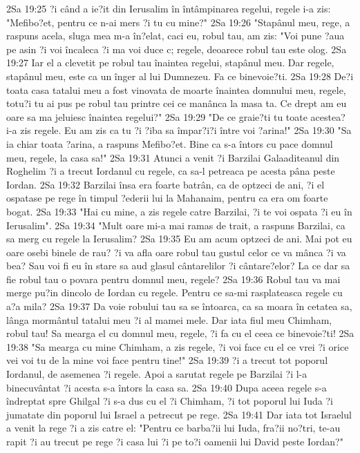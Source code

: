 2Sa 19:25  ?i când a ie?it din Ierusalim în întâmpinarea regelui, regele i-a zis: "Mefibo?et, pentru ce n-ai mers ?i tu cu mine?"
2Sa 19:26  "Stapânul meu, rege, a raspuns acela, sluga mea m-a în?elat, caci eu, robul tau, am zis: "Voi pune ?aua pe asin ?i voi încaleca ?i ma voi duce c; regele, deoarece robul tau este olog.
2Sa 19:27  Iar el a clevetit pe robul tau înaintea regelui, stapânul meu. Dar regele, stapânul meu, este ca un înger al lui Dumnezeu. Fa ce binevoie?ti.
2Sa 19:28  De?i toata casa tatalui meu a fost vinovata de moarte înaintea domnului meu, regele, totu?i tu ai pus pe robul tau printre cei ce manânca la masa ta. Ce drept am eu oare sa ma jeluiesc înaintea regelui?"
2Sa 19:29  "De ce graie?ti tu toate acestea? i-a zis regele. Eu am zis ca tu ?i ?iba sa împar?i?i între voi ?arina!"
2Sa 19:30  "Sa ia chiar toata ?arina, a raspuns Mefibo?et. Bine ca s-a întors cu pace domnul meu, regele, la casa sa!"
2Sa 19:31  Atunci a venit ?i Barzilai Galaaditeanul din Roghelim ?i a trecut Iordanul cu regele, ca sa-l petreaca pe acesta pâna peste Iordan.
2Sa 19:32  Barzilai însa era foarte batrân, ca de optzeci de ani, ?i el ospatase pe rege în timpul ?ederii lui la Mahanaim, pentru ca era om foarte bogat.
2Sa 19:33  "Hai cu mine, a zis regele catre Barzilai, ?i te voi ospata ?i eu în Ierusalim".
2Sa 19:34  "Mult oare mi-a mai ramas de trait, a raspuns Barzilai, ca sa merg cu regele la Ierusalim?
2Sa 19:35  Eu am acum optzeci de ani. Mai pot eu oare osebi binele de rau? ?i va afla oare robul tau gustul celor ce va mânca ?i va bea? Sau voi fi eu în stare sa aud glasul cântarelilor ?i cântare?elor? La ce dar sa fie robul tau o povara pentru domnul meu, regele?
2Sa 19:36  Robul tau va mai merge pu?in dincolo de Iordan cu regele. Pentru ce sa-mi rasplateasca regele cu a?a mila?
2Sa 19:37  Da voie robului tau sa se întoarca, ca sa moara în cetatea sa, lânga mormântul tatalui meu ?i al mamei mele. Dar iata fiul meu Chimham, robul tau! Sa mearga el cu domnul meu, regele, ?i fa cu el ceea ce binevoie?ti!
2Sa 19:38  "Sa mearga cu mine Chimham, a zis regele, ?i voi face cu el ce vrei ?i orice vei voi tu de la mine voi face pentru tine!"
2Sa 19:39  ?i a trecut tot poporul Iordanul, de asemenea ?i regele. Apoi a sarutat regele pe Barzilai ?i l-a binecuvântat ?i acesta s-a întors la casa sa.
2Sa 19:40  Dupa aceea regele s-a îndreptat spre Ghilgal ?i s-a dus cu el ?i Chimham, ?i tot poporul lui Iuda ?i jumatate din poporul lui Israel a petrecut pe rege.
2Sa 19:41  Dar iata tot Israelul a venit la rege ?i a zis catre el: "Pentru ce barba?ii lui Iuda, fra?ii no?tri, te-au rapit ?i au trecut pe rege ?i casa lui ?i pe to?i oamenii lui David peste Iordan?"
